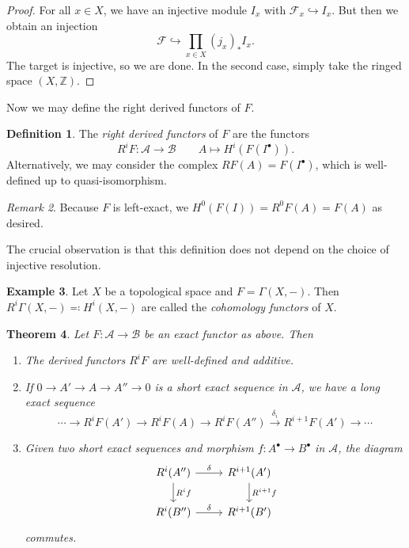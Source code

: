 \documentclass[leqno, openany]{memoir}
\newtheorem{thm}{Theorem}[section]
\theoremstyle{definition}
\newtheorem{defn}[thm]{Definition}
\newtheorem{exm}[thm]{Example}
\theoremstyle{remark}
\newtheorem{rmk}[thm]{Remark}
\theoremstyle{plain}
\theoremstyle{definition}
\theoremstyle{remark}
\newcommand{\Z}{\mathbb{Z}}
\newcommand{\mc}[1]{\mathcal{#1}}
\begin{document}
\begin{proof} For all $x \in X$, we have an injective module $I_x$ with
    $\mc{F}_x \hookrightarrow I_x$. But then we obtain an injection \[ \mc{F}
    \hookrightarrow \prod_{x \in X} {(j_x)}_* I_x. \] The target is injective,
    so we are done. In the second case, simply take the ringed space $(X, \Z)$.
\end{proof}

Now we may define the right derived functors of $F$.  \begin{defn} The
    \textit{right derived functors} of $F$ are the functors \[ R^i F \colon
    \mc{A} \to \mc{B} \qquad A \mapsto H^i(F(I^{\bullet})). \] Alternatively,
    we may consider the complex $RF(A) = F(I^{\bullet})$, which is well-defined
    up to quasi-isomorphism.  \end{defn}

\begin{rmk} Because $F$ is left-exact, we $H^0(F(I)) = R^0 F(A) = F(A)$ as
desired.  \end{rmk}

The crucial observation is that this definition does not depend on the choice
of injective resolution.

\begin{exm} Let $X$ be a topological space and $F = \Gamma(X,-)$. Then $R^i
\Gamma(X,-) \eqqcolon H^i(X,-)$ are called the \textit{cohomology functors} of
$X$.  \end{exm}

\begin{thm} Let $F \colon \mc{A} \to \mc{B}$ be an exact functor as above. Then
    \begin{enumerate} \setcounter{enumi}{0} \item The derived functors $R^i F$
        are well-defined and additive.  \item If $0 \to A' \to A \to A'' \to 0$
        is a short exact sequence in $\mc{A}$, we have a long exact sequence \[
        \cdots \to R^i F(A') \to R^i F(A) \to R^i F(A'') \xrightarrow{\delta_i}
    R^{i+1}F(A') \to \cdots \] \item Given two short exact sequences and
    morphism $f \colon A^{\bullet} \to B^{\bullet}$ in $\mc{A}$, the diagram
    \begin{equation*} \begin{tikzcd} R^i (A'') \ar{r}{\delta} \ar{d}{R^i f} &
    R^{i+1}(A') \ar{d}{R^{i+1}f} \\ R^i(B'') \ar{r}{\delta} & R^{i+1}(B')
\end{tikzcd} \end{equation*} commutes.  \end{enumerate} \end{thm}
\end{document}
